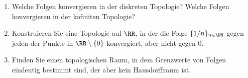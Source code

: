\begin{exercise}\leavevmode
\begin{enumerate}
\item Welche Folgen konvergieren in der diskreten Topologie? Welche Folgen
konvergieren in der kofiniten Topologie?
\item Konstruieren Sie eine Topologie auf $\RR$, in der die Folge
$\{1/n\}_{n\in\NN}$ gegen jeden der Punkte in $\RR\setminus\{0\}$ konvergiert,
aber nicht gegen $0$.
\item Finden Sie einen topologischen Raum, in dem Grenzwerte von Folgen
eindeutig bestimmt sind, der aber kein Hausdorffraum ist.
\end{enumerate}
\end{exercise}


